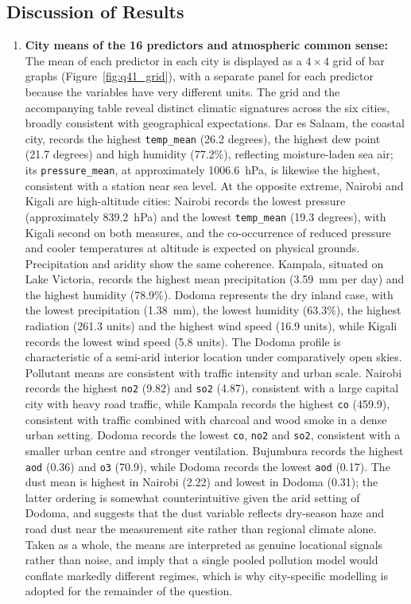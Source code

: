 \documentclass[conference]{IEEEtran}
\begin{document}
\subsection{Discussion of Results}
\begin{enumerate}
    \item \textbf{City means of the 16 predictors and atmospheric common sense:} The mean of each predictor in each city is displayed as a $4 \times 4$ grid of bar graphs (Figure~\ref{fig:q41_grid}), with a separate panel for each predictor because the variables have very different units. The grid and the accompanying table reveal distinct climatic signatures across the six cities, broadly consistent with geographical expectations. Dar es Salaam, the coastal city, records the highest \texttt{temp\_mean} (26.2 degrees), the highest dew point (21.7 degrees) and high humidity (77.2\%), reflecting moisture-laden sea air; its \texttt{pressure\_mean}, at approximately 1006.6~hPa, is likewise the highest, consistent with a station near sea level. At the opposite extreme, Nairobi and Kigali are high-altitude cities: Nairobi records the lowest pressure (approximately 839.2~hPa) and the lowest \texttt{temp\_mean} (19.3 degrees), with Kigali second on both measures, and the co-occurrence of reduced pressure and cooler temperatures at altitude is expected on physical grounds. Precipitation and aridity show the same coherence. Kampala, situated on Lake Victoria, records the highest mean precipitation (3.59~mm per day) and the highest humidity (78.9\%). Dodoma represents the dry inland case, with the lowest precipitation (1.38~mm), the lowest humidity (63.3\%), the highest radiation (261.3 units) and the highest wind speed (16.9 units), while Kigali records the lowest wind speed (5.8 units). The Dodoma profile is characteristic of a semi-arid interior location under comparatively open skies. Pollutant means are consistent with traffic intensity and urban scale. Nairobi records the highest \texttt{no2} (9.82) and \texttt{so2} (4.87), consistent with a large capital city with heavy road traffic, while Kampala records the highest \texttt{co} (459.9), consistent with traffic combined with charcoal and wood smoke in a dense urban setting. Dodoma records the lowest \texttt{co}, \texttt{no2} and \texttt{so2}, consistent with a smaller urban centre and stronger ventilation. Bujumbura records the highest \texttt{aod} (0.36) and \texttt{o3} (70.9), while Dodoma records the lowest \texttt{aod} (0.17). The dust mean is highest in Nairobi (2.22) and lowest in Dodoma (0.31); the latter ordering is somewhat counterintuitive given the arid setting of Dodoma, and suggests that the dust variable reflects dry-season haze and road dust near the measurement site rather than regional climate alone. Taken as a whole, the means are interpreted as genuine locational signals rather than noise, and imply that a single pooled pollution model would conflate markedly different regimes, which is why city-specific modelling is adopted for the remainder of the question.


\end{enumerate}
\end{document}
